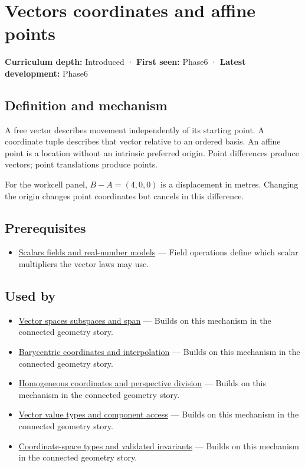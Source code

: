 \hypertarget{appendix-0659864c0aa3}{}
\section{Vectors coordinates and affine points}\label{appendix-0659864c0aa3-vectors-coordinates-and-affine-points}

\textbf{Curriculum depth:} Introduced · \textbf{First seen:} Phase6 · \textbf{Latest development:} Phase6

\subsection{Definition and mechanism}\label{appendix-0659864c0aa3-definition-and-mechanism}

A free vector describes movement independently of its starting point. A coordinate tuple describes that vector relative to an ordered basis. An affine point is a location without an intrinsic preferred origin. Point differences produce vectors; point translations produce points.

For the workcell panel, \(B-A=(4,0,0)\) is a displacement in metres. Changing the origin changes point coordinates but cancels in this difference.

\subsection{Prerequisites}\label{appendix-0659864c0aa3-prerequisites}

\begin{itemize}
\tightlist
\item
  \hyperref[appendix-52051ad550fe]{Scalars fields and real-number models} --- Field operations define which scalar multipliers the vector laws may use.
\end{itemize}

\subsection{Used by}\label{appendix-0659864c0aa3-used-by}

\begin{itemize}
\tightlist
\item
  \hyperref[appendix-173b52c063ae]{Vector spaces subspaces and span} --- Builds on this mechanism in the connected geometry story.
\item
  \hyperref[appendix-02b9d9a81dca]{Barycentric coordinates and interpolation} --- Builds on this mechanism in the connected geometry story.
\item
  \hyperref[appendix-cb3b26862282]{Homogeneous coordinates and perspective division} --- Builds on this mechanism in the connected geometry story.
\item
  \hyperref[appendix-37a39984ba66]{Vector value types and component access} --- Builds on this mechanism in the connected geometry story.
\item
  \hyperref[appendix-380a220e2529]{Coordinate-space types and validated invariants} --- Builds on this mechanism in the connected geometry story.
\end{itemize}

